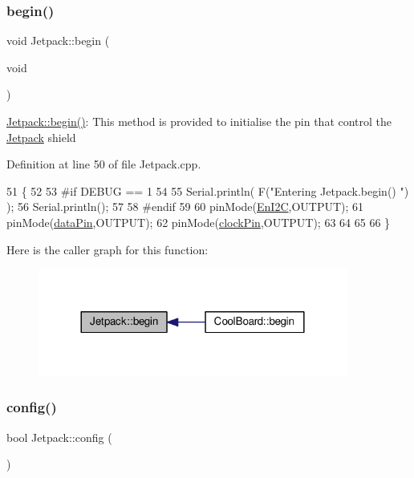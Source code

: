 \subsubsection{\texorpdfstring{begin()}{begin()}}
{\footnotesize\ttfamily void Jetpack\+::begin (\begin{DoxyParamCaption}\item[{void}]{ }\end{DoxyParamCaption})}

\hyperlink{class_jetpack_a5a53e1ebf7aaf3bf3e0d37ea64ca09a7}{Jetpack\+::begin()}\+: This method is provided to initialise the pin that control the \hyperlink{class_jetpack}{Jetpack} shield 

Definition at line 50 of file Jetpack.\+cpp.


\begin{DoxyCode}
51 \{
52 
53 \textcolor{preprocessor}{#if DEBUG == 1 }
54  
55     Serial.println( F(\textcolor{stringliteral}{"Entering Jetpack.begin() "}) );
56     Serial.println();
57 
58 \textcolor{preprocessor}{#endif}
59 
60     pinMode(\hyperlink{class_jetpack_a81df984fb4cea98c71aa1a1cfcdfe814}{EnI2C},OUTPUT);
61     pinMode(\hyperlink{class_jetpack_a3d669a56e93c71dd25f970d4ed7d0c00}{dataPin},OUTPUT);
62     pinMode(\hyperlink{class_jetpack_a58ebb991f358f3ae94e82148b0221b5a}{clockPin},OUTPUT);
63     
64     
65 
66 \}
\end{DoxyCode}
Here is the caller graph for this function\+:\nopagebreak
\begin{figure}[H]
\begin{center}
\leavevmode
\includegraphics[width=288pt]{df/d1d/class_jetpack_a5a53e1ebf7aaf3bf3e0d37ea64ca09a7_icgraph}
\end{center}
\end{figure}
\mbox{\label{class_jetpack_ab065ee83e244265a2223a22f3ee4a719}} 
\subsubsection{\texorpdfstring{config()}{config()}}
{\footnotesize\ttfamily bool Jetpack\+::config (\begin{DoxyParamCaption}{ }\end{DoxyParamCaption})}


